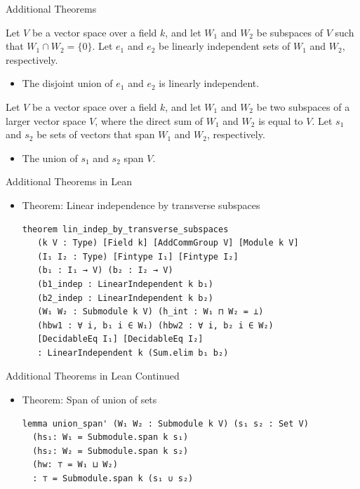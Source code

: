 \documentclass[svgnames]{beamer}
\begin{document}
\begin{frame}[label={sec:proof_comparison}]{Additional Theorems}

\begin{Theorem}
Let $V$ be a vector space over a field $k$, and let $W_1$ and $W_2$ be subspaces of $V$ such that $W_1 \cap W_2 = \{0\}$. Let $e_1$ and $e_2$ be linearly independent sets of $W_1$ and $W_2$, respectively. 
\begin{itemize}
    \item The disjoint union of $e_1$ and $e_2$ is linearly independent.
\end{itemize}
\end{Theorem}

\begin{Theorem}
Let $V$ be a vector space over a field $k$, and let $W_1$ and $W_2$ be two subspaces of a larger vector space $V$, where the direct sum of $W_1$ and $W_2$ is equal to $V$. Let $s_1$ and $s_2$ be sets of vectors that span $W_1$ and $W_2$, respectively.
\begin{itemize}
    \item The union of $s_1$ and $s_2$ span $V$. 
\end{itemize}
\end{Theorem}

\end{frame}

\begin{frame}[label={sec:proof_comparison},fragile]{Additional Theorems in Lean}
\begin{itemize}
\item Theorem: Linear independence by transverse subspaces

{\scriptsize
\begin{verbatim}
theorem lin_indep_by_transverse_subspaces
   (k V : Type) [Field k] [AddCommGroup V] [Module k V] 
   (I₁ I₂ : Type) [Fintype I₁] [Fintype I₂]
   (b₁ : I₁ → V) (b₂ : I₂ → V)
   (b1_indep : LinearIndependent k b₁)
   (b2_indep : LinearIndependent k b₂)
   (W₁ W₂ : Submodule k V) (h_int : W₁ ⊓ W₂ = ⊥)
   (hbw1 : ∀ i, b₁ i ∈ W₁) (hbw2 : ∀ i, b₂ i ∈ W₂)
   [DecidableEq I₁] [DecidableEq I₂]
   : LinearIndependent k (Sum.elim b₁ b₂)
\end{verbatim}
}

\end{itemize}
\end{frame}

\begin{frame}[label={sec:proof_comparison},fragile]{Additional Theorems in Lean Continued}
\begin{itemize}
\item Theorem: Span of union of sets 

{\scriptsize
\begin{verbatim}
lemma union_span' (W₁ W₂ : Submodule k V) (s₁ s₂ : Set V)
  (hs₁: W₁ = Submodule.span k s₁)
  (hs₂: W₂ = Submodule.span k s₂)
  (hw: ⊤ = W₁ ⊔ W₂)
  : ⊤ = Submodule.span k (s₁ ∪ s₂)
\end{verbatim}
}

\end{itemize}
\end{frame}
\end{document}
